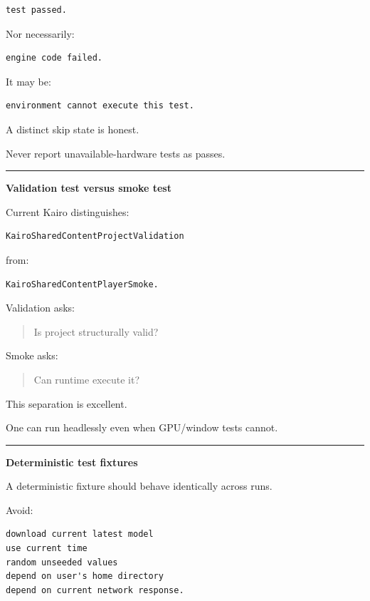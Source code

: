 \begin{verbatim}
test passed.
\end{verbatim}

Nor necessarily:

\begin{verbatim}
engine code failed.
\end{verbatim}

It may be:

\begin{verbatim}
environment cannot execute this test.
\end{verbatim}

A distinct skip state is honest.

Never report unavailable-hardware tests as passes.

\begin{center}\rule{0.5\linewidth}{0.5pt}\end{center}

\textbf{Validation test versus smoke test}

Current Kairo distinguishes:

\begin{verbatim}
KairoSharedContentProjectValidation
\end{verbatim}

from:

\begin{verbatim}
KairoSharedContentPlayerSmoke.
\end{verbatim}

Validation asks:

\begin{quote}
Is project structurally valid?
\end{quote}

Smoke asks:

\begin{quote}
Can runtime execute it?
\end{quote}

This separation is excellent.

One can run headlessly even when GPU/window tests cannot.

\begin{center}\rule{0.5\linewidth}{0.5pt}\end{center}

\textbf{Deterministic test fixtures}

A deterministic fixture should behave identically across runs.

Avoid:

\begin{verbatim}
download current latest model
use current time
random unseeded values
depend on user's home directory
depend on current network response.
\end{verbatim}

